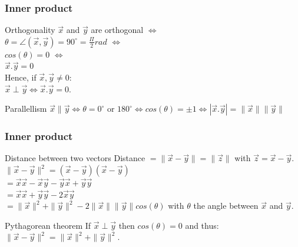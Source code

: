 \begin{frame}
	\frametitle{Inner product}
	\begin{block}{Orthogonality}
		$\overrightarrow{x}$ and $\overrightarrow{y}$ are orthogonal $\Leftrightarrow$\\ $\theta=\angle(\overrightarrow{x},\overrightarrow{y})=90^{\circ}=\frac{\Pi}{2} rad$ $\Leftrightarrow$\\
		$cos(\theta)=0$ $\Leftrightarrow$\\
		$\overrightarrow{x}.\overrightarrow{y}=0$\\
		\vspace{4mm}
		Hence, if $\overrightarrow{x},\overrightarrow{y} \neq 0$:\\
		$\overrightarrow{x}\perp\overrightarrow{y} \Leftrightarrow \overrightarrow{x}.\overrightarrow{y}=0$.
	\end{block} 
	\begin{block}{Parallellism}
		$\overrightarrow{x}\parallel\overrightarrow{y}\Leftrightarrow
		\theta=0^{\circ}$ or $180^{\circ} \Leftrightarrow
		cos(\theta)=\pm 1 \Leftrightarrow
		|\overrightarrow{x}.\overrightarrow{y}|=\|\overrightarrow{x}\|\|\overrightarrow{y}\|$
	\end{block} 
\end{frame}

\begin{frame}
	\frametitle{Inner product}
	\begin{block}{Distance between two vectors}
		Distance $=\|\overrightarrow{x}-\overrightarrow{y}\|=\|\overrightarrow{z}\|$ with $\overrightarrow{z}=\overrightarrow{x}-\overrightarrow{y}$.\\
		$\|\overrightarrow{x}-\overrightarrow{y}\|^2=(\overrightarrow{x}-\overrightarrow{y}) (\overrightarrow{x}-\overrightarrow{y})$ \\
		$=\overrightarrow{x}\overrightarrow{x}-\overrightarrow{x}\overrightarrow{y}-\overrightarrow{y}\overrightarrow{x}+\overrightarrow{y}\overrightarrow{y}$ \\ 
		$=\overrightarrow{x}\overrightarrow{x}+\overrightarrow{y}\overrightarrow{y}-2\overrightarrow{x}\overrightarrow{y}$ \\
		$=\|\overrightarrow{x}\|^2+\|\overrightarrow{y}\|^2-2\|\overrightarrow{x}\|\|\overrightarrow{y}\|cos(\theta)$ with $\theta$ the angle between $\overrightarrow{x}$ and $\overrightarrow{y}$.
	\end{block}
	\begin{block}{Pythagorean theorem}
		If $\overrightarrow{x}\perp\overrightarrow{y}$ then $cos(\theta)=0$ and thus:\\
		$\|\overrightarrow{x}-\overrightarrow{y}\|^2=\|\overrightarrow{x}\|^2+\|\overrightarrow{y}\|^2$.
	\end{block} 
\end{frame}

